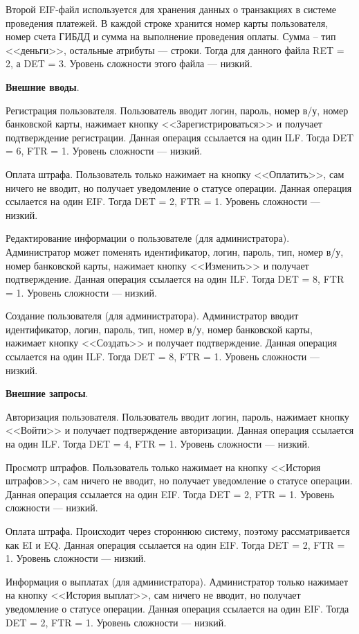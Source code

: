 \documentclass{bmstu}
\begin{document}
Второй EIF-файл используется для хранения данных о транзакциях в системе проведения платежей. 
В каждой строке хранится номер карты пользователя, номер счета ГИБДД и сумма на выполнение проведения оплаты. 
Сумма -- тип <<деньги>>, остальные атрибуты --- строки. 
Тогда для данного файла RET = 2, а DET = 3. 
Уровень сложности этого файла --- низкий.

\textbf{Внешние вводы}.

Регистрация пользователя. 
Пользователь вводит логин, пароль, номер в/у, номер банковской карты, нажимает кнопку <<Зарегистрироваться>> и получает подтверждение регистрации. 
Данная операция ссылается на один ILF. 
Тогда DET = 6, FTR = 1. 
Уровень сложности --- низкий.

Оплата штрафа. 
Пользователь только нажимает на кнопку <<Оплатить>>, сам ничего не вводит, но получает уведомление о статусе операции. 
Данная операция ссылается на один EIF. 
Тогда DET = 2, FTR = 1. 
Уровень сложности --- низкий.

Редактирование информации о пользователе (для администратора). 
Администратор может поменять идентификатор, логин, пароль, тип, номер в/у, номер банковской карты, нажимает кнопку <<Изменить>> и получает подтверждение. 
Данная операция ссылается на один ILF. 
Тогда DET = 8, FTR = 1. 
Уровень сложности --- низкий.

Создание пользователя (для администратора). 
Администратор вводит идентификатор, логин, пароль, тип, номер в/у, номер банковской карты, нажимает кнопку <<Создать>> и получает подтверждение. 
Данная операция ссылается на один ILF. 
Тогда DET = 8, FTR = 1. 
Уровень сложности --- низкий.

\textbf{Внешние запросы}.

Авторизация пользователя. 
Пользователь вводит логин, пароль, нажимает кнопку <<Войти>> и получает подтверждение авторизации. 
Данная операция ссылается на один ILF. 
Тогда DET = 4, FTR = 1. 
Уровень сложности --- низкий.

Просмотр штрафов. 
Пользователь только нажимает на кнопку <<История штрафов>>, сам ничего не вводит, но получает уведомление о статусе операции. 
Данная операция ссылается на один EIF. 
Тогда DET = 2, FTR = 1. 
Уровень сложности --- низкий.

Оплата штрафа. 
Происходит через стороннюю систему, поэтому рассматривается как EI и EQ. 
Данная операция ссылается на один EIF. 
Тогда DET = 2, FTR = 1. 
Уровень сложности --- низкий.

Информация о выплатах (для администратора). 
Администратор только нажимает на кнопку <<История выплат>>, сам ничего не вводит, но получает уведомление о статусе операции. 
Данная операция ссылается на один EIF. 
Тогда DET = 2, FTR = 1. 
Уровень сложности --- низкий.
\end{document}
